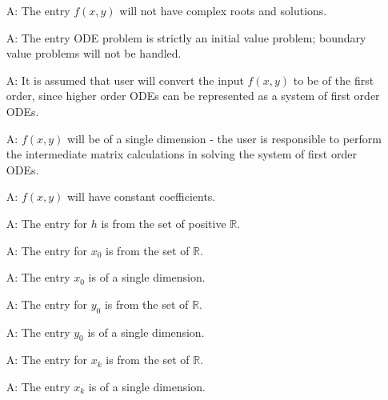 \documentclass[12pt]{article}
\newcounter{assumpnum} %
\begin{document}
\begin{itemize}
\item[A\refstepcounter{assumpnum}\theassumpnum \label{A_roots}:]
The entry $f(x, y)$ will not have complex roots and solutions.

\item[A\refstepcounter{assumpnum}\theassumpnum \label{A_boundary}:]
The entry ODE problem is strictly an initial value problem; boundary value problems will
not be handled.

\item[A\refstepcounter{assumpnum}\theassumpnum \label{A_orderoff}:]
It is assumed that user will convert the input $f(x,y)$ to be of the first order,
since higher order ODEs can be represented as a system of first order ODEs.

\item[A\refstepcounter{assumpnum}\theassumpnum \label{A_dimoff}:]
$f(x, y)$ will be of a single dimension - the user is responsible to perform the intermediate
matrix calculations in solving the system of first order ODEs.

\item[A\refstepcounter{assumpnum}\theassumpnum \label{A_dimoff}:]
$f(x, y)$ will have constant coefficients.

\item[A\refstepcounter{assumpnum}\theassumpnum \label{A_entriesofh}:]
The entry for $h$ is from the set of positive $\mathbb{R}$.

\item[A\refstepcounter{assumpnum}\theassumpnum \label{A_entriesofx0}:]
The entry for $x_0$ is from the set of $\mathbb{R}$.

\item[A\refstepcounter{assumpnum}\theassumpnum \label{A_dimofx0}:]
The entry $x_0$ is of a single dimension.

\item[A\refstepcounter{assumpnum}\theassumpnum \label{A_entriesofy0}:]
The entry for $y_0$ is from the set of $\mathbb{R}$.

\item[A\refstepcounter{assumpnum}\theassumpnum \label{A_dimofy0}:]
The entry $y_0$ is of a single dimension.

\item[A\refstepcounter{assumpnum}\theassumpnum \label{A_entriesofxk}:]
The entry for $x_k$ is from the set of $\mathbb{R}$.

\item[A\refstepcounter{assumpnum}\theassumpnum \label{A_dimofxk}:]
The entry $x_k$ is of a single dimension.

\end{itemize}
\end{document}
